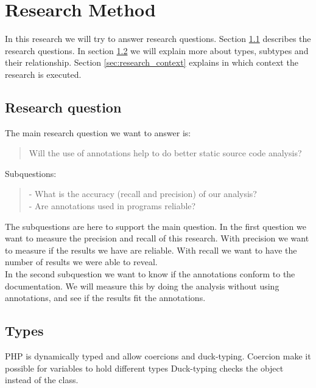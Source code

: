 \documentclass[../main.tex]{subfiles}
\begin{document}
    \chapter{Research Method}\label{ch:research_method}

    In this research we will try to answer research questions.
    Section \ref{sec:research_question} describes the research questions.
    In section \ref{sec:types} we will explain more about types, subtypes and their relationship.
    Section \ref{sec:research_context} explains in which context the research is executed.

    \section{Research question}\label{sec:research_question}
    The main research question we want to answer is:
    \\
    \begin{quote}
        Will the use of annotations\footnotemark{} help to do better static source code analysis?
    \end{quote}
    Subquestions:
    \begin{quote}
        - What is the accuracy (recall and precision) of our analysis?
        \\
        - Are annotations used in programs reliable?
    \end{quote}
    The subquestions are here to support the main question. 
    In the first question we want to measure the precision and recall of this research.
    With precision we want to measure if the results we have are reliable.
    With recall we want to have the number of results we were able to reveal.
    \\
    In the second subquestion we want to know if the annotations conform to the documentation.
    We will measure this by doing the analysis without using annotations, and see if the results fit the annotations.    
    
   \section{Types}\label{sec:types}
    PHP is dynamically typed and allow coercions and duck-typing.
    Coercion make it possible for variables to hold different types
    Duck-typing checks the object instead of the class.
    
\end{document}
